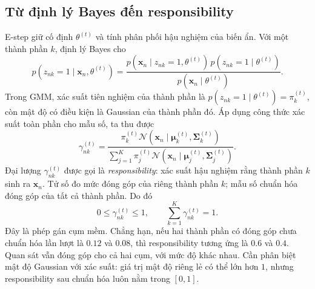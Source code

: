 \subsection{Từ định lý Bayes đến responsibility}
E-step giữ cố định $\theta^{(t)}$ và tính phân phối hậu nghiệm của biến ẩn. Với một thành phần $k$, định lý Bayes cho
\begin{equation}
p(z_{nk}=1\mid\mathbf{x}_n,\theta^{(t)})
=\frac{p(\mathbf{x}_n\mid z_{nk}=1,\theta^{(t)})\,p(z_{nk}=1\mid\theta^{(t)})}{p(\mathbf{x}_n\mid\theta^{(t)})}.
\end{equation}
Trong GMM, xác suất tiên nghiệm của thành phần là $p(z_{nk}=1\mid\theta^{(t)})=\pi_k^{(t)}$, còn mật độ có điều kiện là Gaussian của thành phần đó. Áp dụng công thức xác suất toàn phần cho mẫu số, ta thu được
\begin{equation}
\boxed{\gamma_{nk}^{(t)}=
\frac{\pi_k^{(t)}\mathcal{N}(\mathbf{x}_n\mid\boldsymbol{\mu}_k^{(t)},\boldsymbol{\Sigma}_k^{(t)})}
{\sum_{j=1}^K\pi_j^{(t)}\mathcal{N}(\mathbf{x}_n\mid\boldsymbol{\mu}_j^{(t)},\boldsymbol{\Sigma}_j^{(t)})}.}
\label{eq:estep-responsibility}
\end{equation}
Đại lượng $\gamma_{nk}^{(t)}$ được gọi là \emph{responsibility}: xác suất hậu nghiệm rằng thành phần $k$ sinh ra $\mathbf{x}_n$. Tử số đo mức đóng góp của riêng thành phần $k$; mẫu số chuẩn hóa đóng góp của tất cả thành phần. Do đó
\begin{equation}
0\leq\gamma_{nk}^{(t)}\leq 1,\qquad \sum_{k=1}^K\gamma_{nk}^{(t)}=1.
\end{equation}
Đây là phép gán cụm mềm. Chẳng hạn, nếu hai thành phần có đóng góp chưa chuẩn hóa lần lượt là $0.12$ và $0.08$, thì responsibility tương ứng là $0.6$ và $0.4$. Quan sát vẫn đóng góp cho cả hai cụm, với mức độ khác nhau. Cần phân biệt mật độ Gaussian với xác suất: giá trị mật độ riêng lẻ có thể lớn hơn $1$, nhưng responsibility sau chuẩn hóa luôn nằm trong $[0,1]$.

